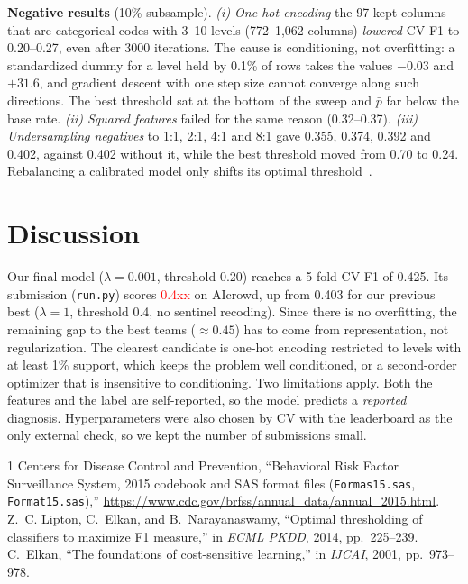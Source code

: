 \documentclass[10pt,conference]{IEEEtran}
\newcommand{\tbd}[1]{\textcolor{red}{#1}}
\begin{document}
\textbf{Negative results} (10\% subsample). \emph{(i) One-hot encoding}
the 97 kept columns that are categorical codes with 3--10 levels (772--1,062
columns) \emph{lowered} CV F1 to 0.20--0.27, even after 3000 iterations. The
cause is conditioning, not overfitting: a standardized dummy for a level held
by 0.1\% of rows takes the values $-0.03$ and $+31.6$, and gradient descent
with one step size cannot converge along such directions. The best threshold
sat at the bottom of the sweep and $\bar p$ far below the base rate.
\emph{(ii) Squared features} failed for the same reason (0.32--0.37).
\emph{(iii) Undersampling negatives} to 1:1, 2:1, 4:1 and 8:1 gave 0.355,
0.374, 0.392 and 0.402, against 0.402 without it, while the best threshold
moved from 0.70 to 0.24. Rebalancing a calibrated model only shifts its
optimal threshold~\cite{elkan}.

\section{Discussion}
Our final model ($\lambda=0.001$, threshold 0.20) reaches a 5-fold CV F1 of
0.425. Its submission
(\texttt{run.py}) scores \tbd{0.4xx} on AIcrowd, up from 0.403 for our
previous best ($\lambda=1$, threshold 0.4, no sentinel recoding).
Since there is no overfitting, the remaining gap to the best teams
($\approx0.45$) has to come from representation, not regularization. The clearest
candidate is one-hot encoding restricted to levels with at least 1\% support,
which keeps the problem well conditioned, or a second-order optimizer that is
insensitive to conditioning. Two limitations apply. Both the features and the
label are self-reported, so the model predicts a \emph{reported} diagnosis.
Hyperparameters were also chosen by CV with the leaderboard as the only
external check, so we kept the number of submissions small.

\begin{thebibliography}{1}
 Centers for Disease Control and Prevention, ``Behavioral Risk
Factor Surveillance System, 2015 codebook and SAS format files
(\texttt{Formas15.sas}, \texttt{Format15.sas}),''
\url{https://www.cdc.gov/brfss/annual_data/annual_2015.html}.
 Z.~C. Lipton, C.~Elkan, and B.~Narayanaswamy, ``Optimal
thresholding of classifiers to maximize F1 measure,'' in \emph{ECML PKDD},
2014, pp.~225--239.
 C.~Elkan, ``The foundations of cost-sensitive learning,'' in
\emph{IJCAI}, 2001, pp.~973--978.
\end{thebibliography}
\end{document}
